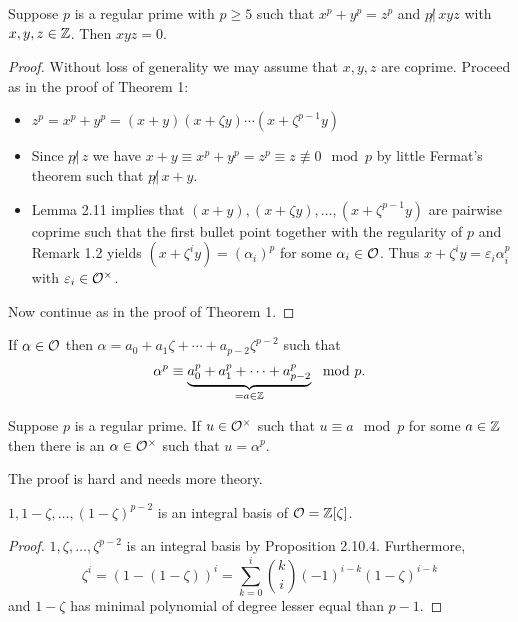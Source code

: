 
\begin{Prop}
	Suppose $p$ is a regular prime with $p \geq 5$ such that 
	$x^p +y^p = z^p$ and $p \not | \, xyz$ with $x,y,z \in \mathbb{Z}$.
	Then $xyz = 0$.
\end{Prop}

\begin{proof}
	Without loss of generality we may assume that $x,y,z$ are coprime. Proceed as in the proof of Theorem 1:
	\begin{itemize}
		\item $z^p = x^p + y^p = (x+y)(x+\zeta y) \cdots \left( x+ \zeta^{p-1}y \right)$
		\item Since $p\not | \, z$ we have 
				$x+y \equiv x^p + y^p = z^p \equiv z \not \equiv 0 \mod p$
				by little Fermat's theorem such that $p \not | \, x+y$.
		\item Lemma 2.11 implies that $(x+y),(x+\zeta y), \dots, \left( x+ 
				\zeta^{p-1}y \right)$ are pairwise coprime such that the first bullet point together with the regularity of $p$ and Remark 1.2 yields
				$ \left( x+ \zeta^i y \right)= \left( \alpha_i \right)^p$ for some $\alpha_i \in \mathcal{O}$. Thus $x+ \zeta^i y = \varepsilon_i  \alpha_i^p$ with
				$\varepsilon_i \in \mathcal{O}^\times$.
	\end{itemize}
	Now continue as in the proof of Theorem 1. 
\end{proof}

\begin{recall*}[Example 1.2.8]
	If $\alpha \in \mathcal{O}$ then $\alpha = a_0 + a_1 \zeta + \cdots + a_{p-2} \zeta^{p-2}$ such that
	\[ \alpha^p \equiv \underbrace{a_0^p + a_1^p + \cdots + a_{p-2} ^p}_{= a \in \mathbb{Z}} \mod p.
	\]
\end{recall*}

\begin{Lem}
	Suppose $p$ is a regular prime. If $u \in\mathcal{O}^\times$ such that $u\equiv a \mod p$ for some $a \in \mathbb{Z}$ then there is an $\alpha \in\mathcal{O}^\times$ such that $u = \alpha^p$.
\end{Lem}

The proof is hard and needs more theory.


\begin{Bem}
	$1, 1- \zeta, \dots, (1-\zeta)^{p-2}$ is an integral basis of $\mathcal{O}=\mathbb{Z}[\zeta]$.
\end{Bem}

\begin{proof}
	$1,  \zeta, \dots, \zeta^{p-2}$ is an integral basis by Proposition 2.10.4. Furthermore,
	\[ \zeta^i = \left(1-  (1-\zeta)\right)^i
	=\sum_{k=0}^{i} \binom{k}{i} (-1)^{i-k} (1-\zeta)^{i-k}
	\]
	and $1-\zeta$ has minimal polynomial of degree lesser equal than $p-1$.
\end{proof}


